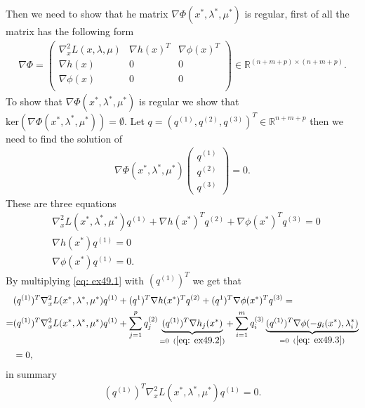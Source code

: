 Then we need to show that he matrix $\nabla \Phi(x^{*}, \lambda^{*},
\mu^{*})$ is regular, first of all the matrix has the following form
\begin{align}
    \nabla \Phi =
    \begin{pmatrix}
        \nabla_x^{2}L(x,\lambda, \mu) & \nabla h(x)^{T} & \nabla
        \phi(x)^{T}\\
        \nabla h(x) & 0 & 0\\
        \nabla \phi(x) & 0 & 0\\
    \end{pmatrix} \in \mathbb{R}^{(n+m+p) \times  (n+m+p)}.
\end{align}
To show that $\nabla \Phi(x^{*}, \lambda^{*},
\mu^{*})$ is regular we show that $\text{ker}\left(\nabla \Phi(x^{*}, \lambda^{*},
\mu^{*})  \right) = \emptyset$.
\newline
Let $ q = (q^{(1)}, q^{(2)}, q^{(3)})^{T} \in
\mathbb{R}^{n+m+p}$ then we need to find the solution of
\begin{align}
        \nabla \Phi(x^{*}, \lambda^{*}, \mu^{*}) \begin{pmatrix}
        q^{(1)}\\q^{(2)}\\q^{(3)} \end{pmatrix} =0.
\end{align}
These are three equations
\begin{align}
    &\nabla_x^{2}L(x^{*},\lambda^{*},\mu^{*})q^{(1)} + \nabla h(x^{*})^{T} q^{(2)}
    + \nabla \phi(x^{*})^{T}q^{(3)} = 0 \label{eq: ex49.1}\\
    &\nabla h(x^{*}) q^{(1)} = 0 \label{eq: ex49.2}\\
    &\nabla \phi(x^{*}) q^{(1)} = 0 \label{eq: ex49.3}.
\end{align}
By multiplying \ref{eq: ex49.1} with $(q^{(1)})^{T}$ we get that
\begin{align}
    &(q^{(1)})^{T}\nabla_x^{2}L(x^{*},\lambda^{*},\mu^{*})q^{(1)} +(q^{1})^{T} \nabla h(x^{*})^{T} q^{(2)}
    + (q^{1})^{T}\nabla \phi(x^{*})^{T}q^{(3)}=\\
    =&(q^{(1)})^{T}\nabla_x^{2}L(x^{*},\lambda^{*},\mu^{*})q^{(1)}
    + \sum_{j=1}^{p} q_j^{(2)}\underbrace{(q^{(1)})^{T}\nabla h_j(x^{*})}_{=0
    \;\; (\ref{eq: ex49.2})}
    + \sum_{i=1}^{m} q_i^{(3)}\underbrace{(q^{(1)})^{T}\nabla \phi(-g_i(x^{*}),
\lambda_i^{*})}_{=0 \;\; (\ref{eq: ex49.3})} \\
     &= 0,
\end{align}
in summary
\begin{align}
    (q^{(1)})^{T}\nabla_x^{2}L(x^{*},\lambda^{*},\mu^{*})q^{(1)} =0.
\end{align}
